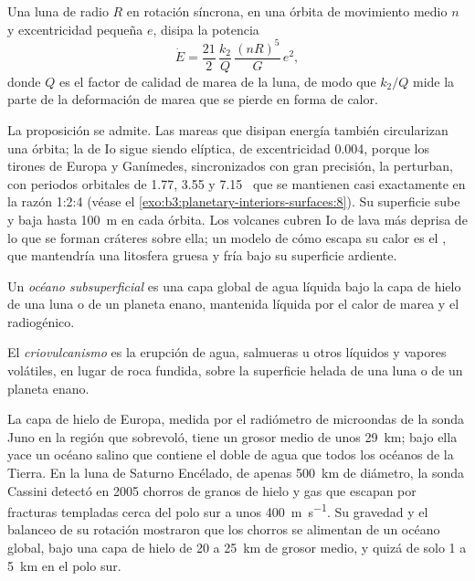 \begin{proposition}\label{prop:b3:planetary-interiors-surfaces:tidal-power}
Una luna de radio $R$ en rotación síncrona, en una órbita de movimiento medio
$n$ y excentricidad pequeña $e$, disipa la potencia
\[
  \dot E = \frac{21}{2}\,\frac{k_2}{Q}\,\frac{(nR)^5}{G}\,e^2 ,
\]
donde $Q$ es el factor de calidad de marea de la luna, de modo que $k_2/Q$ mide
la parte de la deformación de marea que se pierde en forma de calor.
\end{proposition}

La proposición se admite. Las mareas que disipan energía también circularizan
una órbita; la de Io sigue siendo elíptica, de excentricidad 0.004, porque
los tirones de Europa y Ganímedes, sincronizados con gran precisión, la perturban, con
periodos orbitales de 1.77, 3.55 y \num{7.15}~ que se mantienen casi exactamente en
la razón 1:2:4 (véase el \cref{exo:b3:planetary-interiors-surfaces:8}). Su superficie sube
y baja hasta \qty{100}{m} en cada órbita. Los volcanes
cubren Io de lava más deprisa de lo que se forman cráteres sobre ella; un modelo de
cómo escapa su calor es el , que mantendría una litosfera gruesa y
fría bajo su superficie ardiente.

\begin{definition}\label{def:b3:planetary-interiors-surfaces:ocean-world}
Un \emph{océano subsuperficial} es una capa global de
agua líquida bajo la capa de hielo de una luna o de un planeta enano, mantenida líquida por
el calor de marea y el radiogénico.
\end{definition}

\begin{definition}[Criovulcanismo]\label{def:b3:planetary-interiors-surfaces:cryovolcanism}
El \emph{criovulcanismo} es la erupción de agua, salmueras
u otros líquidos y vapores volátiles, en lugar de roca fundida, sobre la
superficie helada de una luna o de un planeta enano.
\end{definition}

La capa de hielo de Europa, medida por el radiómetro de microondas de la sonda Juno
en la región que sobrevoló, tiene un grosor medio de unos \qty{29}{km}; bajo ella
yace un océano salino que contiene el doble de agua que todos los
océanos de la Tierra. En la luna de Saturno Encélado, de apenas \qty{500}{km}
de diámetro, la sonda Cassini detectó en 2005 chorros de granos de hielo y gas
que escapan por fracturas templadas cerca del polo sur a unos
\qty{400}{m.s^{-1}}. Su gravedad y el balanceo de su rotación mostraron
que los chorros se alimentan de un océano global, bajo una capa de hielo de 20 a
\qty{25}{km} de grosor medio, y quizá de solo 1 a \qty{5}{km} en el
polo sur.

